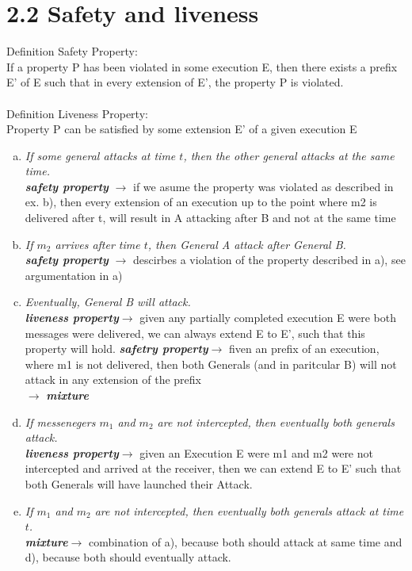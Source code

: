 \documentclass{article}
\begin{document}
	\section*{2.2 Safety and liveness}
    \begin{adjustwidth}{2em}{2em}
        Definition Safety Property:\\
        If a property P has been violated in some execution E, then there exists a prefix E' of E such that in every extension
        of E', the property P is violated.
        \\ \\
        Definition Liveness Property:\\
        Property P can be satisfied by some extension E' of a given execution E\\

        
		\begin{enumerate}[(a)]
			\item \textit{If some general attacks at time $t$, then the other general attacks at the same time.} \\
			\textit{\textbf{safety property}} $\rightarrow$ if we asume the property was violated as described in ex. b), then every extension of an execution up to the point where m2 is delivered after t, will result in A attacking after B and not at the same time 
			\item \textit{If $m_2$ arrives after time $t$, then General A attack after General B.} \\
			\textit{\textbf{safety property}} $\rightarrow$ descirbes a violation of the property described in a), see argumentation in a)
			\item \textit{Eventually, General B will attack.} \\
            \textit{\textbf{liveness property}}$\rightarrow$ given any partially completed execution E were both messages were delivered, we can always extend E to E', such that this property will hold.
            \textit{\textbf{safetry property}}$\rightarrow$ fiven an prefix of an execution, where m1 is not delivered, then both Generals (and in paritcular B) will not attack in any extension of the prefix\\
            $\rightarrow$ \textit{\textbf{mixture}}
			\item \textit{If messenegers $m_1$ and $m_2$ are not intercepted, then eventually both generals attack.} \\
			\textit{\textbf{liveness property}}$\rightarrow$ given an Execution E were m1 and m2 were not intercepted and arrived at the receiver, then we can extend E to E' such that both Generals will have launched their Attack.
			\item \textit{If $m_1$ and $m_2$ are not intercepted, then eventually both generals attack at time $t$.} \\
			\textit{\textbf{mixture}}$\rightarrow$ combination of a), because both should attack at same time and d), because both should eventually attack.
		\end{enumerate}			
	\end{adjustwidth}
	
\end{document}
